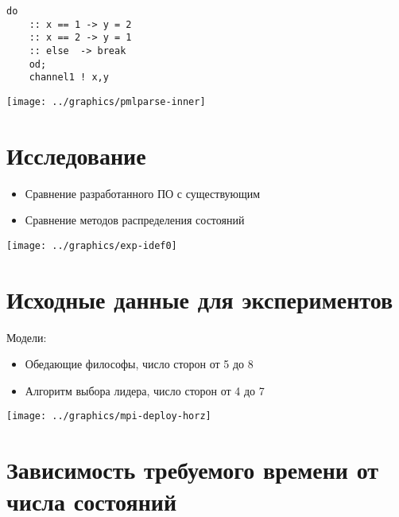 \documentclass[12pt]{article}
\begin{document}
\begin{minipage}[m]{0.35\linewidth}
  \begin{lstlisting}[language=Promela,style=simplecode,numbers=none]
    do
    :: x == 1 -> y = 2
    :: x == 2 -> y = 1
    :: else  -> break
    od;
    channel1 ! x,y
  \end{lstlisting}
\end{minipage}
\begin{minipage}[m]{0.75\linewidth}
  \texttt{[image: ../graphics/pmlparse-inner]}
\end{minipage}

\section{Исследование}
\label{sec:experim}

\begin{itemize}
\item Сравнение разработанного ПО с существующим
\item Сравнение методов распределения состояний
\end{itemize}

\begin{center}
  \texttt{[image: ../graphics/exp-idef0]}
\end{center}

\section{Исходные данные для экспериментов}
\label{sec:experim-input}

\begin{minipage}[t]{0.15\linewidth}
Модели:  
\end{minipage}
\begin{minipage}[t]{0.85\linewidth}
  \begin{itemize}
  \item Обедающие философы, число сторон от 5 до 8
  \item Алгоритм выбора лидера, число сторон от 4 до 7
  \end{itemize}

\end{minipage}
\begin{center}
  \texttt{[image: ../graphics/mpi-deploy-horz]}
\end{center}

\section{Зависимость требуемого времени от числа состояний}
\label{sec:states-time}
\end{document}
